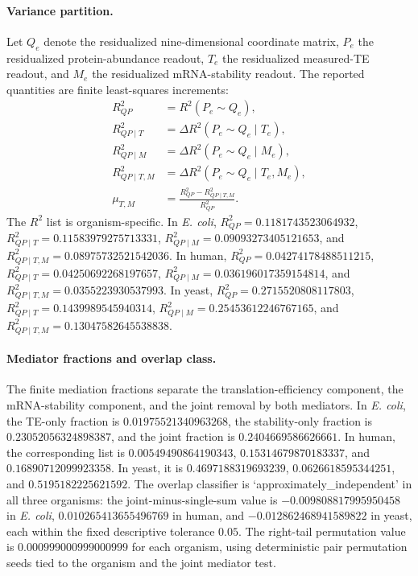\paragraph{Variance partition.}
Let $Q_e$ denote the residualized nine-dimensional coordinate matrix, $P_e$ the residualized protein-abundance readout, $T_e$ the residualized measured-TE readout, and $M_e$ the residualized mRNA-stability readout. The reported quantities are finite least-squares increments:
$$
\begin{aligned}
R^2_{QP} &= R^2(P_e \sim Q_e),\\
R^2_{QP\mid T} &= \Delta R^2(P_e \sim Q_e \mid T_e),\\
R^2_{QP\mid M} &= \Delta R^2(P_e \sim Q_e \mid M_e),\\
R^2_{QP\mid T,M} &= \Delta R^2(P_e \sim Q_e \mid T_e,M_e),\\
\mu_{T,M} &= \frac{R^2_{QP}-R^2_{QP\mid T,M}}{R^2_{QP}}.
\end{aligned}
$$
The $R^2$ list is organism-specific. In \emph{E. coli},
$R^2_{QP}=0.1181743523064932$, $R^2_{QP\mid T}=0.11583979275713331$, $R^2_{QP\mid M}=0.09093273405121653$, and $R^2_{QP\mid T,M}=0.08975732521542036$. In human,
$R^2_{QP}=0.04274178488511215$, $R^2_{QP\mid T}=0.04250692268197657$, $R^2_{QP\mid M}=0.036196017359154814$, and $R^2_{QP\mid T,M}=0.0355223930537993$. In yeast,
$R^2_{QP}=0.2715520808117803$, $R^2_{QP\mid T}=0.1439989545940314$, $R^2_{QP\mid M}=0.25453612246767165$, and $R^2_{QP\mid T,M}=0.13047582645538838$.

\paragraph{Mediator fractions and overlap class.}
The finite mediation fractions separate the translation-efficiency component, the mRNA-stability component, and the joint removal by both mediators. In \emph{E. coli}, the TE-only fraction is $0.01975521340963268$, the stability-only fraction is $0.23052056324898387$, and the joint fraction is $0.2404669586626661$. In human, the corresponding list is $0.00549490864190343$, $0.15314679870183337$, and $0.16890712099923358$. In yeast, it is $0.4697188319693239$, $0.0626618595344251$, and $0.5195182225621592$. The overlap classifier is `approximately\_independent' in all three organisms: the joint-minus-single-sum value is $-0.009808817995950458$ in \emph{E. coli}, $0.010265413655496769$ in human, and $-0.012862468941589822$ in yeast, each within the fixed descriptive tolerance $0.05$. The right-tail permutation value is $0.000999000999000999$ for each organism, using deterministic pair permutation seeds tied to the organism and the joint mediator test.

